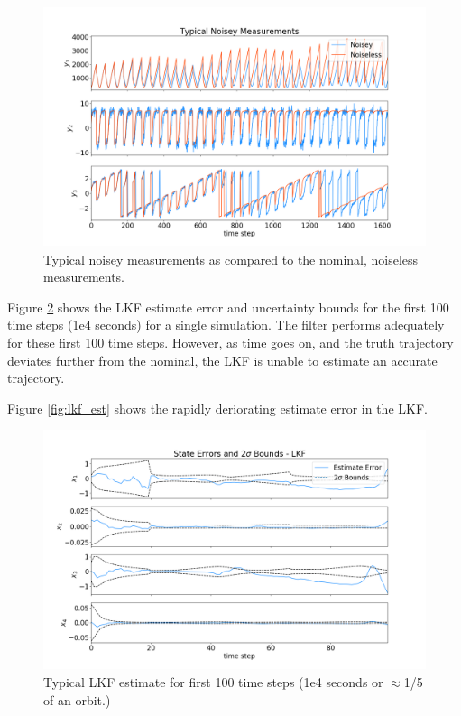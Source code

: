 \documentclass[11pt, a4paper]{article}
\begin{document}
\begin{figure}[H]
	\centering
	\includegraphics[width=\textwidth]{Figures/noisey_meas.png}
	\caption{Typical noisey measurements as compared to the nominal, noiseless measurements.}
	\label{fig:noisey_meas}
\end{figure}

Figure \ref{fig:lkf_est_zoom} shows the LKF estimate error and uncertainty bounds for the first 100 time steps (1e4 seconds) for a single simulation. 
The filter performs adequately for these first 100 time steps.
However, as time goes on, and the truth trajectory deviates further from the nominal, the LKF is unable to estimate an accurate trajectory.

Figure \ref{fig:lkf_est} shows the rapidly deriorating estimate error in the LKF.  

\begin{figure}[H]
	\centering
	\includegraphics[width=\textwidth]{Figures/lkf_estimate_th_ZOOM.png}
	\caption{Typical LKF estimate for first 100 time steps (1e4 seconds or $\approx$1/5 of an orbit.)}
	\label{fig:lkf_est_zoom}
\end{figure}
\end{document}
